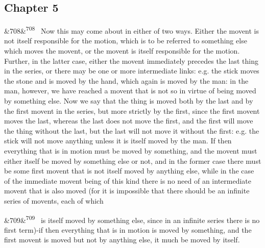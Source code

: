 \documentclass[12pt]{article}
\newcommand{\para}[1][]{\par\noindent\ifx&#1&\else\textsuperscript{\footnotesize #1}~\fi}
\begin{document}
\subsection*{Chapter 5}

\para[708] Now this may come about in either of two ways. Either the movent is not itself responsible for the motion, which is to be referred to something else which moves the movent, or the movent is itself responsible for the motion. Further, in the latter case, either the movent immediately precedes the last thing in the series, or there may be one or more intermediate links: e.g. the stick moves the stone and is moved by the hand, which again is moved by the man: in the man, however, we have reached a movent that is not so in virtue of being moved by something else. Now we say that the thing is moved both by the last and by the first movent in the series, but more strictly by the first, since the first movent moves the last, whereas the last does not move the first, and the first will move the thing without the last, but the last will not move it without the first: e.g. the stick will not move anything unless it is itself moved by the man. If then everything that is in motion must be moved by something, and the movent must either itself be moved by something else or not, and in the former case there must be some first movent that is not itself moved by anything else, while in the case of the immediate movent being of this kind there is no need of an intermediate movent that is also moved (for it is impossible that there should be an infinite series of movents, each of which

\para[709] is itself moved by something else, since in an infinite series there is no first term)-if then everything that is in motion is moved by something, and the first movent is moved but not by anything else, it much be moved by itself.
\end{document}
